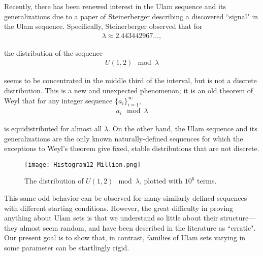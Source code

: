 \documentclass{amsart}
\theoremstyle{theorem}
\theoremstyle{definition}
\begin{document}
Recently, there has been renewed interest in the Ulam sequence and its generalizations due to a paper of Steinerberger \cite{steinerberger_2016} describing a discovered ``signal" in the Ulam sequence. Specifically, Steinerberger observed that for 
	\begin{align*}
    \lambda \approx 2.443442967\ldots,
    \end{align*}
    
\noindent the distribution of the sequence
	\begin{align*}
    U(1,2) \mod \lambda
    \end{align*}
    
\noindent seems to be concentrated in the middle third of the interval, but is not a discrete distribution. This is a new and unexpected phenomenon; it is an old theorem of Weyl \cite{weyl_1916} that for any integer sequence $\{a_i\}_{i = 1}^\infty$,
	\begin{align*}
    a_i \mod \lambda
    \end{align*}

\noindent is equidistributed for almost all $\lambda$. On the other hand, the Ulam sequence and its generalizations are the only known naturally-defined sequences for which the exceptions to Weyl's theorem give fixed, stable distributions that are not discrete.

	\begin{figure}
	\texttt{[image: Histogram12\_Million.png]}
	
	\caption{The distribution of $U(1,2) \mod \lambda$, plotted with $10^6$ terms.}
	\label{UlamHistogram1_2}
	\end{figure}
    
This same odd behavior can be observed for many similarly defined sequences with different starting conditions. However, the great difficulty in proving anything about Ulam sets is that we understand so little about their structure---they almost seem random, and have been described in the literature as ``erratic". Our present goal is to show that, in contrast, families of Ulam sets varying in some parameter can be startlingly rigid.
\end{document}
